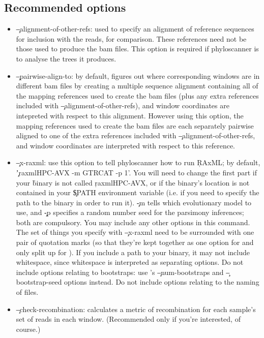 \subsection{Recommended options}
\begin{itemize}
\item \c{--alignment-of-other-refs}: used to specify an alignment of reference sequences for inclusion with the reads, for comparison.
These references need not be those used to produce the bam files.
This option is required if phyloscanner is to analyse the trees it produces.
\item \c{--pairwise-align-to}: by default, \p figures out where corresponding windows are in different bam files by creating a multiple sequence alignment containing all of the mapping references used to create the bam files (plus any extra references included with \c{--alignment-of-other-refs}), and window coordinates are intepreted with respect to this alignment.
However using this option, the mapping references used to create the bam files are each separately pairwise aligned to one of the extra references included with \c{--alignment-of-other-refs}, and window coordinates are interpreted with respect to this reference.
\item \c{--x-raxml}: use this option to tell phyloscanner how to run \c{RAxML}; by default, \c{'raxmlHPC-AVX -m GTRCAT -p 1'}.
You will need to change the first part if your \r binary is not called \c{raxmlHPC-AVX}, or if the binary's location is not contained in your \c{\$PATH} environment variable (i.e. if you need to specify the path to the binary in order to run it).
\c{-m} tells \R which evolutionary model to use, and \c{-p} specifies a random number seed for the parsimony inferences; both are compulsory.
You may include any other \R options in this command.
The set of things you specify with \c{--x-raxml} need to be surrounded with one pair of quotation marks (so that they're kept together as one option for \p and only split up for \R).
If you include a path to your \R binary, it may not include whitespace, since whitespace is interpreted as separating \R options.
Do not include options relating to bootstraps: use \p's \c{--num-bootstraps} and \c{--bootstrap-seed} options instead.
Do not include options relating to the naming of files.
\item \c{--check-recombination}: calculates a metric of recombination for each
sample's set of reads in each window.
(Recommended only if you're interested, of course.)

\end{itemize}
